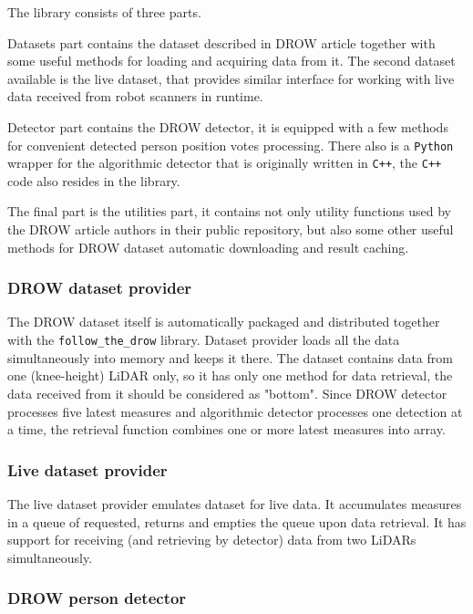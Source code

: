 \documentclass{article}
\begin{document}
The library consists of three parts.

Datasets part contains the dataset described in DROW article together with some useful methods for loading and acquiring data from it.
The second dataset available is the live dataset, that provides similar interface for working with live data received from robot scanners in runtime.

Detector part contains the DROW detector, it is equipped with a few methods for convenient detected person position votes processing.
There also is a \texttt{Python} wrapper for the algorithmic detector that is originally written in \texttt{C++}, the \texttt{C++} code also resides in the library.

The final part is the utilities part, it contains not only utility functions used by the DROW article authors in their public repository, but also some other useful methods for DROW dataset automatic downloading and result caching.

\subsubsection{DROW dataset provider}

The DROW dataset itself is automatically packaged and distributed together with the \texttt{follow\_the\_drow} library.
Dataset provider loads all the data simultaneously into memory and keeps it there.
The dataset contains data from one (knee-height) LiDAR only, so it has only one method for data retrieval, the data received from it should be considered as "bottom".
Since DROW detector processes five latest measures and algorithmic detector processes one detection at a time, the retrieval function combines one or more latest measures into array.

\subsubsection{Live dataset provider}

The live dataset provider emulates dataset for live data.
It accumulates measures in a queue of requested, returns and empties the queue upon data retrieval.
It has support for receiving (and retrieving by detector) data from two LiDARs simultaneously.

\subsubsection{DROW person detector}
\end{document}
